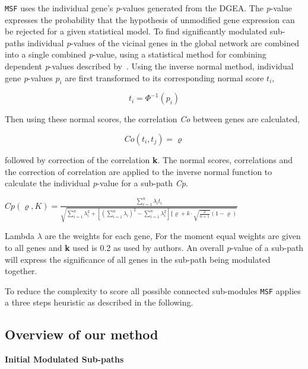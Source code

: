 \documentclass[twocolumn]{article}
\begin{document}
\texttt{MSF} uses the individual gene's \textit{p}-values generated
from the DGEA. The \textit{p}-value
expresses the probability that the hypothesis of unmodified gene
expression can be rejected for a given statistical model. To find
significantly modulated sub-paths individual \textit{p}-values of the
vicinal genes in the global network are combined into a single
combined \textit{p}-value, using a statistical method for combining
dependent \textit{p}-values described by~\cite{Hartung}. Using the
inverse normal method, individual gene \textit{p}-values $p_i$ are
first transformed to its corresponding normal score $t_i$,

\[ t_i = \Phi^{-1}(p_i) \]  

Then using these normal scores, the correlation \textit{Co} between genes are calculated, 

\[ Co (t_i, t_j) =\varrho \]

followed by correction of the correlation \textbf{k}. The normal
scores, correlations and the correction of correlation are applied to
the inverse normal function to calculate the individual
\textit{p}-value for a sub-path \textit{Cp}. \newline

$  {\scriptstyle Cp(\varrho,K) = \frac{\sum_{i=1}^{n} \lambda_i t_i}{\sqrt{\sum_{i=1}^{n} \lambda_i^2 +[(\sum_{i=1}^{n} \lambda_i)^2- \sum_{i=1}^{n} \lambda_i^2]\{\varrho+k\cdot\sqrt{\frac{2}{n+1}} (1-\varrho)}}} $\\ \newline

Lambda $\lambda$ are the weights for each gene, For the moment equal
weights are given to all genes and \textbf{k} used is 0.2 as used by authors. An
overall \textit{p}-value of a sub-path will express the significance
of all genes in the sub-path being modulated together.

To reduce the complexity to score all possible connected sub-modules
\texttt{MSF} applies a three steps heuristic as described in the
following.\newline
 
\subsection*{Overview of our method}

\textbf{Initial Modulated Sub-paths}
\end{document}

